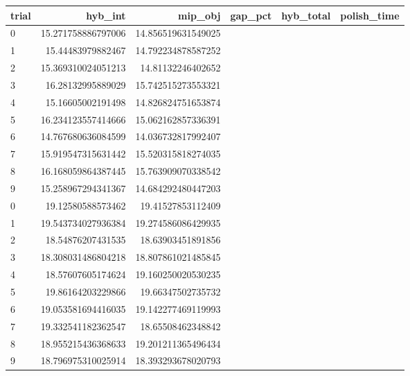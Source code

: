 \begin{tabular}{lrrrrr}
\hline
trial & hyb_int & mip_obj & gap_pct & hyb_total & polish_time \\ \hline
0 & 15.271758886797006 & 14.856519631549025 &  &  &  \\
1 & 15.44483979882467 & 14.792234878587252 &  &  &  \\
2 & 15.369310024051213 & 14.81132246402652 &  &  &  \\
3 & 16.28132995889029 & 15.742515273553321 &  &  &  \\
4 & 15.16605002191498 & 14.826824751653874 &  &  &  \\
5 & 16.234123557414666 & 15.062162857336391 &  &  &  \\
6 & 14.767680636084599 & 14.036732817992407 &  &  &  \\
7 & 15.919547315631442 & 15.520315818274035 &  &  &  \\
8 & 16.168059864387445 & 15.763909070338542 &  &  &  \\
9 & 15.258967294341367 & 14.684292480447203 &  &  &  \\
0 & 19.12580588573462 & 19.41527853112409 &  &  &  \\
1 & 19.543734027936384 & 19.274586086429935 &  &  &  \\
2 & 18.54876207431535 & 18.63903451891856 &  &  &  \\
3 & 18.308031486804218 & 18.807861021485845 &  &  &  \\
4 & 18.57607605174624 & 19.160250020530235 &  &  &  \\
5 & 19.86164203229866 & 19.66347502735732 &  &  &  \\
6 & 19.053581694416035 & 19.142277469119993 &  &  &  \\
7 & 19.332541182362547 & 18.65508462348842 &  &  &  \\
8 & 18.955215436368633 & 19.201211365496434 &  &  &  \\
9 & 18.796975310025914 & 18.393293678020793 &  &  &  \\
\hline
\end{tabular}
